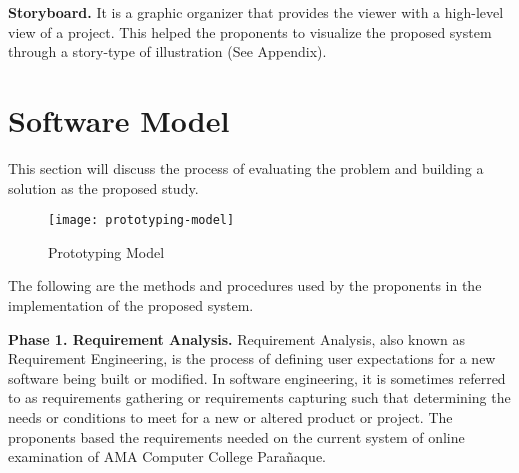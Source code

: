 





\textbf{Storyboard.}
It is a graphic organizer that provides the viewer with a high-level view of a project.
This helped the proponents to visualize the proposed system through a story-type of illustration (See Appendix).

\section{Software Model}

This section will discuss the process of evaluating the problem and building a solution as the proposed study.

\begin{figure}[h!]
   \begin{center}
      \texttt{[image: prototyping-model]}
      \caption{Prototyping Model}
   \end{center}
\end{figure}

The following are the methods and procedures used by the proponents in the implementation of the proposed system.

\textbf{Phase 1. Requirement Analysis.}
Requirement Analysis, also known as Requirement Engineering, is the process of defining user expectations for a new software being built or modified.
In software engineering, it is sometimes referred to as requirements gathering or requirements capturing such that determining the needs or conditions to meet for a new or altered product or project.
The proponents based the requirements needed on the current system of online examination of AMA Computer College Parañaque.

